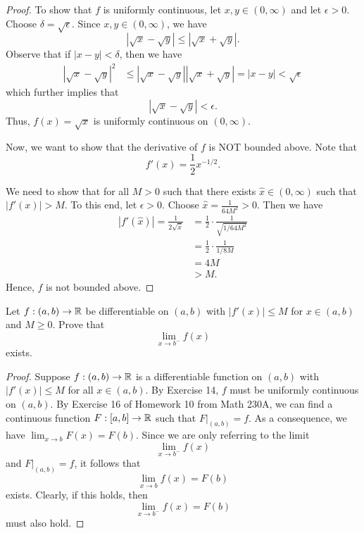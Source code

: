 \documentclass[a4paper]{article}
\begin{document}
\begin{proof}
        To show that \( f  \) is uniformly continuous, let \( x,y \in (0,\infty )  \) and let \( \epsilon > 0  \). Choose \( \delta = \sqrt{ \epsilon }  \). Since \( x,y \in (0,\infty ) \), we have 
        \[  | \sqrt{ x }  - \sqrt{ y }  | \leq | \sqrt{ x }  + \sqrt{ y }  |.  \]
        Observe that if \( | x - y  |  < \delta \), then we have
        \begin{align*}
            | \sqrt{ x }  - \sqrt{ y }  |^{2} &\leq | \sqrt{ x } - \sqrt{ y }  |  | \sqrt{ x  }  + \sqrt{ y }  |   
                                              = | x - y  |
                                              < \sqrt{ \epsilon }
        \end{align*}
        which further implies that 
        \[  | \sqrt{ x } - \sqrt{ y }  |  < \epsilon. \]
        Thus, \( f(x) = \sqrt{ x }   \) is uniformly continuous on \( (0,\infty)  \).

        Now, we want to show that the derivative of \( f  \) is NOT bounded above. Note that 
        \[  f'(x) = \frac{ 1 }{ 2 }  x^{-1/2}. \]
        
        We need to show that for all \( M > 0  \) such that there exists \( \hat{x} \in (0,\infty ) \) such that \( | f'(x) |  > M  \). To this end, let \( \epsilon > 0  \). Choose \( \hat{x} = \frac{ 1 }{ 64 M^{2} } > 0   \). Then we have 
        \begin{align*}
            | f'(\hat{x}) | = \frac{ 1 }{ 2 \sqrt{ \hat{x} }  } &= \frac{ 1 }{ 2 }  \cdot \frac{ 1  }{  \sqrt{  1/64 M^{2} }  }  \\
                                                                &= \frac{ 1 }{ 2 } \cdot \frac{ 1 }{ 1/8M } \\ 
                                                                &= 4M \\
                                                                &> M. 
        \end{align*}
        Hence, \( f  \) is not bounded above.
\end{proof}


\begin{problem}
    Let \( f: (a,b) \to \mathbb{R}  \) be differentiable on \( (a,b) \) with \( | f'(x)  |  \leq M  \) for \( x \in (a,b) \) and \( M \geq 0  \). Prove that 
    \[  \lim_{ x \to b^{-} }  f(x) \] 
    exists.
\end{problem}
\begin{proof}
    Suppose \( f: (a,b) \to \mathbb{R}  \) is a differentiable function on \( (a,b) \) with \( | f'(x) | \leq M  \) for all \( x \in (a,b) \). By Exercise 14, \( f  \) must be uniformly continuous on \( (a,b) \). By Exercise 16 of Homework 10 from Math 230A, we can find a continuous function \( F: [a,b] \to \mathbb{R}  \) such that \( F |_{(a,b)} = f \). As a consequence, we have \( \lim_{ x \to b } F(x) = F(b) \). Since we are only referring to the limit 
    \[  \lim_{ x \to b^{-} }  f(x) \]
    and \( F |_{(a,b)} = f  \), it follows that 
    \[  \lim_{ x \to b } f(x) = F(b) \]
    exists. Clearly, if this holds, then 
    \[  \lim_{ x \to b^{-} } f(x) = F(b) \]
    must also hold.
\end{proof}
\end{document}
